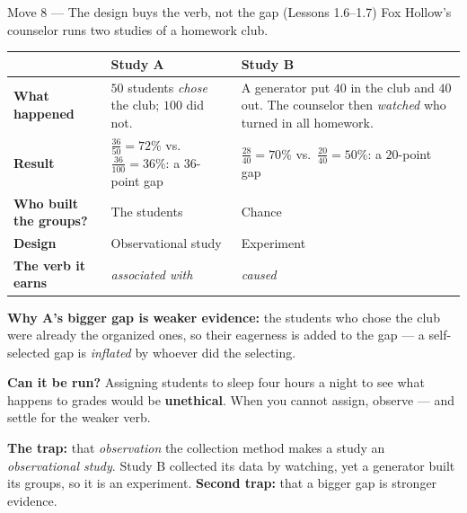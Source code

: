 \documentclass[10pt]{article}
\begin{document}
\vspace{3pt}
\boxguard[18]
\begin{notesbox}{Move 8 --- The design buys the verb, not the gap (Lessons 1.6--1.7)}
\small
Fox Hollow's counselor runs two studies of a homework club.

\vspace{2pt}
\renewcommand{\arraystretch}{1.25}
\begin{tabularx}{\linewidth}{@{} >{\bfseries}p{3.0cm} X X @{}}
\rowcolor{frost}
& \textbf{Study A} & \textbf{Study B} \\
\midrule
What happened & $50$ students \emph{chose} the club; $100$ did not. & A generator put $40$ in
  the club and $40$ out. The counselor then \emph{watched} who turned in all homework. \\
Result & $\frac{36}{50} = 72\%$ vs.\ $\frac{36}{100} = 36\%$: a $36$-point gap &
  $\frac{28}{40} = 70\%$ vs.\ $\frac{20}{40} = 50\%$: a $20$-point gap \\
Who built the groups? & The students & Chance \\
Design & Observational study & Experiment \\
The verb it earns & \emph{associated with} & \emph{caused} \\
\end{tabularx}

\vspace{3pt}
\textbf{Why A's bigger gap is weaker evidence:} the students who chose the club were already
the organized ones, so their eagerness is added to the gap --- a self-selected gap is
\emph{inflated} by whoever did the selecting.

\vspace{2pt}
\textbf{Can it be run?} Assigning students to sleep four hours a night to see what happens to
grades would be \textbf{unethical}. When you cannot assign, observe --- and settle for the
weaker verb.

\vspace{2pt}
\textbf{The trap:} that \emph{observation} the collection method makes a study an
\emph{observational study}. Study B collected its data by watching, yet a generator built its
groups, so it is an experiment. \textbf{Second trap:} that a bigger gap is stronger evidence.
\end{notesbox}
\end{document}
